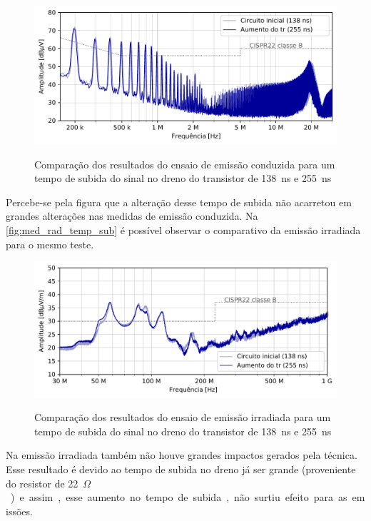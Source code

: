     \begin{figure}[H]
    	\centering 
    	\caption{Comparação dos resultados do ensaio de emissão conduzida para um tempo de subida do sinal no dreno do transistor de \SI{138}{\nano\second} e \SI{255}{\nano\second}}
    	\includegraphics[scale=.9]{pdf/cond/Aumento do tr do transistor2.pdf}
    	\label{fig:med_cond_temp_sub}
    \end{figure}
    
    Percebe-se pela figura que a alteração desse tempo de subida não acarretou em grandes alterações nas medidas de emissão conduzida. Na \autoref{fig:med_rad_temp_sub} é possível observar o comparativo da emissão irradiada para o mesmo teste.  
    
    \begin{figure}[H]
    	\centering
    	\caption{Comparação dos resultados do ensaio de emissão irradiada para um tempo de subida do sinal no dreno do transistor de \SI{138}{\nano\second} e \SI{255}{\nano\second}}
    	\includegraphics[scale=.9]{pdf/rad/Aumento do tr do transistor2.pdf}
    	\label{fig:med_rad_temp_sub}
    \end{figure}
    
    Na emissão irradiada também não houve grandes impactos gerados pela técnica. Esse resultado é devido ao tempo de subida no dreno já ser grande (proveniente do resistor de \SI{22}{$\Omega$}) e assim, esse aumento no tempo de subida, não surtiu efeito para as emissões. 
    
